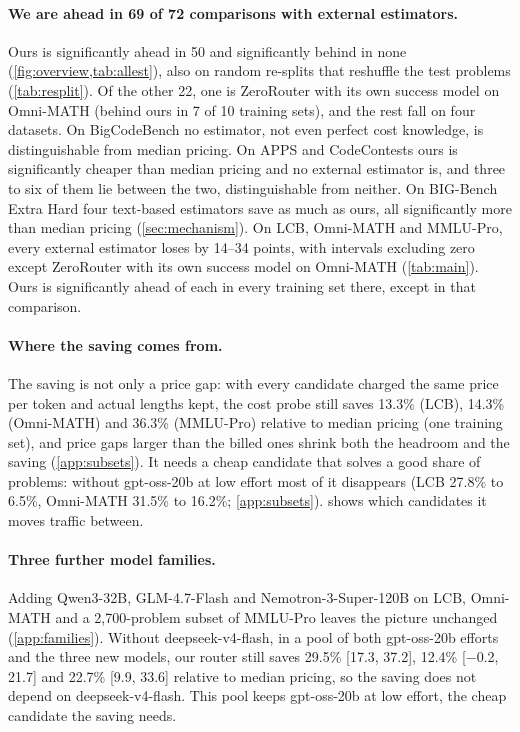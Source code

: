 \documentclass[10pt]{article}
\begin{document}
\paragraph{We are ahead in 69 of 72 comparisons with external estimators.}
Ours is significantly ahead in 50 and significantly behind in none (\cref{fig:overview,tab:allest}), also on random re-splits that reshuffle the test problems (\cref{tab:resplit}). Of the other 22, one is ZeroRouter with its own success model on Omni-MATH (behind ours in 7 of 10 training sets), and the rest fall on four datasets. On BigCodeBench no estimator, not even perfect cost knowledge, is distinguishable from median pricing. On APPS and CodeContests ours is significantly cheaper than median pricing and no external estimator is, and three to six of them lie between the two, distinguishable from neither. On BIG-Bench Extra Hard four text-based estimators save as much as ours, all significantly more than median pricing (\cref{sec:mechanism}). On LCB, Omni-MATH and MMLU-Pro, every external estimator loses by 14--34 points, with intervals excluding zero except ZeroRouter with its own success model on Omni-MATH (\cref{tab:main}). Ours is significantly ahead of each in every training set there, except in that comparison.

\paragraph{Where the saving comes from.}
The saving is not only a price gap: with every candidate charged the same price per token and actual lengths kept, the cost probe still saves 13.3\% (LCB), 14.3\% (Omni-MATH) and 36.3\% (MMLU-Pro) relative to median pricing (one training set), and price gaps larger than the billed ones shrink both the headroom and the saving (\cref{app:subsets}). It needs a cheap candidate that solves a good share of problems: without gpt-oss-20b at low effort most of it disappears (LCB 27.8\% to 6.5\%, Omni-MATH 31.5\% to 16.2\%; \cref{app:subsets}).  shows which candidates it moves traffic between.

\paragraph{Three further model families.}
Adding Qwen3-32B, GLM-4.7-Flash and Nemotron-3-Super-120B on LCB, Omni-MATH and a 2,700-problem subset of MMLU-Pro leaves the picture unchanged (\cref{app:families}). Without deepseek-v4-flash, in a pool of both gpt-oss-20b efforts and the three new models, our router still saves 29.5\% [17.3, 37.2], 12.4\% [$-$0.2, 21.7] and 22.7\% [9.9, 33.6] relative to median pricing, so the saving does not depend on deepseek-v4-flash. This pool keeps gpt-oss-20b at low effort, the cheap candidate the saving needs.
\end{document}
